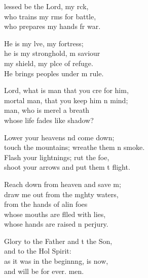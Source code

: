 \settowidth{\versewidth}{touch the mountains; wreathe them in smoke.}
\begin{psalmverse}%
  \begin{patverse}
lessed be the Lord, my rck,\Flex\\
    who trains my rms for battle,\Med\\
    who prepares my hands fr war.

He is my lve, my fortress;\Med\\
    he is my stronghold, m saviour\\
my shield, my plce of refuge.\Med\\
    He brings peoples under m rule.

Lord, what is man that you cre for him,\Med\\
    mortal man, that you keep him \pointup{\i}n mind;\\
man, who is merel a breath\Med\\
    whose life fades like  shadow?

Lower your heavens nd come down;\Med\\
    touch the mountains; wreathe them \pointup{\i}n smoke.\\
Flash your lightnings; rut the foe,\Med\\
    shoot your arrows and put them t flight.

Reach down from heaven and save m;\Flex\\
    draw me out from the m\pointup{\i}ghty waters,\Med\\
    from the hands of alin foes\\
whose mouths are f\pointup{\i}lled with lies,\Med\\
    whose hands are raised \pointup{\i}n perjury.

Glory to the Father and t the Son,\Med\\
    and to the Hol Spirit:\\
as it was in the beginn\pointup{\i}ng, is now,\Med\\
    and will be for ever. men.
  \end{patverse}
\end{psalmverse}
